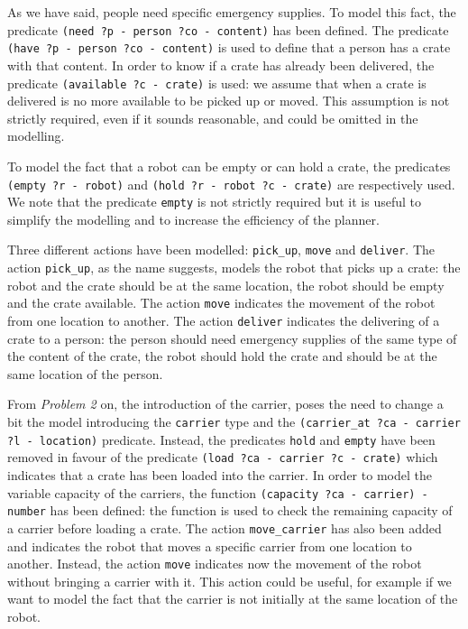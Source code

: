As we have said, people need specific emergency supplies. To model this fact, the predicate
\texttt{(need ?p - person ?co - content)} has been defined. The predicate 
\texttt{(have ?p - person ?co - content)} is used to define that a person has a crate with that content.
In order to know if a crate has already been delivered, the predicate \texttt{(available ?c - crate)}
is used: we assume that when a crate is delivered is no more available to be picked up or moved.
This assumption is not strictly required, even if it sounds reasonable, and could be omitted in the modelling.


To model the fact that a robot can be empty or can hold a crate, the predicates \texttt{(empty ?r - robot)} and
\texttt{(hold ?r - robot ?c - crate)} are respectively used.
We note that the predicate \texttt{empty} is not strictly required but it is useful to simplify the modelling
and to increase the efficiency of the planner.


Three different actions have been modelled: \texttt{pick\_up}, 
\texttt{move} and \texttt{deliver}.
The action \texttt{pick\_up}, as the name suggests, models the robot that picks up a crate:
the robot and the crate should be at the same location, the robot should be empty and the crate available.
The action \texttt{move} indicates the movement of the robot from one location to another.
The action \texttt{deliver} indicates the delivering of a crate to a person: the person should need emergency
supplies of the same type of the content of the crate, the robot should hold the crate and should be at the 
same location of the person.


From \textit{Problem 2} on, the introduction of the carrier, poses the need to change a bit the model 
introducing the \texttt{carrier} type and the \texttt{(carrier\_at ?ca - carrier ?l - location)} predicate.
Instead, the predicates \texttt{hold} and \texttt{empty} have been removed in favour of the predicate
\texttt{(load ?ca - carrier ?c - crate)} which indicates that a crate has been loaded into the carrier.
In order to model the variable capacity of the carriers, the function \texttt{(capacity ?ca - carrier) - number}
has been defined: the function is used to check the remaining capacity of a carrier before loading a crate.
The action \texttt{move\_carrier} has also been added and indicates the robot that moves a specific carrier 
from one location to another.
Instead, the action \texttt{move} indicates now the movement of the robot without bringing a carrier with it.
This action could be useful, for example if we want to model the fact that the carrier is not initially at 
the same location of the robot.

